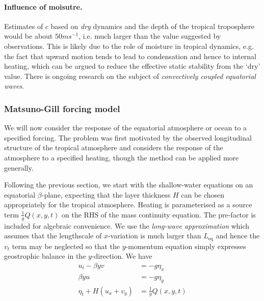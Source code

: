 \documentclass{jknotes}
\begin{document}
\paragraph{Influence of moisutre.} Estimates of $c$ based on \emph{dry}
dynamics and the depth of the tropical troposphere would be about $50 m
s^{-1}$, i.e. much larger than the value suggested by observations. This is
likely due to the role of moisture in tropical dynamics, e.g. the fact that
upward motion tends to lead to condensation and hence to internal heating,
which can be argued to reduce the effective static stability from the `dry'
value. There is ongoing research on the subject of \emph{convectively coupled
equatorial waves}.

\subsubsection{Matsuno-Gill forcing model}
We will now consider the response of the equatorial atmosphere or ocean to a
specified forcing. The problem was first motivated by the observed
longitudinal structure of the tropical atmosphere and considers the response
of the atmosphere to a specified heating, though the method can be applied
more generally.

Following the previous section, we start with the shallow-water equations on
an equatorial $\beta$-plane, expecting that the layer thickness $H$ can be
chosen appropriately for the tropical atmosphere. Heating is parameterised as
a source term $\frac{1}{g}Q(x,y,t)$ on the RHS of the mass continuity
equation. The pre-factor is included for algebraic convenience. We use the
\emph{long-wave approximation} which assumes that the lengthscale of
$x$-variation is much larger than $L_{\text{eq}}$ and hence the $v_t$ term may
be neglected so that the $y$-momentum equation simply expresses geostrophic
balance in the $y$-direction. We have
\begin{align}
	u_t - \beta y v &= - g \eta_x \label{eq:15.14}\\
	\beta y u &= - g \eta_y \label{eq:15.15}\\
	\eta_t + H(u_x + v_y) &= \frac{1}{g}Q(x,y,t)
\end{align}
\end{document}
